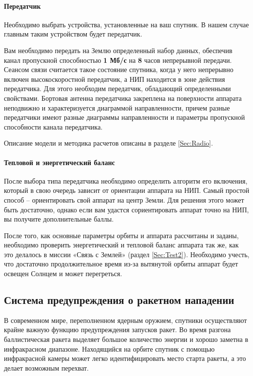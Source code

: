 \documentclass[12pt,a4paper]{article}
\begin{document}
\paragraph{Передатчик}

Необходимо выбрать устройства, установленные на ваш спутник. В нашем случае главным таким
устройством будет передатчик.

Вам необходимо передать на Землю определенный набор данных, обеспечив канал пропускной
способностью \textbf{1 Мб/с} на \textbf{8} часов непрерывной передачи. Сеансом связи
считается такое состояние спутника, когда у него непрерывно включен высокоскоростной
передатчик, а НИП находится в зоне действия передатчика. Для этого необходим передатчик,
обладающий определенными свойствами. Бортовая антенна передатчика закреплена на
поверхности аппарата неподвижно и характеризуется диаграммой направленности, причем разные
передатчики имеют разные диаграммы направленности и параметры пропускной способности
канала передатчика.

Описание модели и методика расчетов описаны в разделе \ref{Sec:Radio}.

\paragraph{Тепловой и энергетический баланс}

После выбора типа передатчика необходимо определить алгоритм его включения, который в свою
очередь зависит от ориентации аппарата на НИП. Самый простой способ – ориентировать свой
аппарат на центр Земли. Для решения этого может быть достаточно, однако если вам удастся
сориентировать аппарат точно на НИП, вы получите дополнительные баллы.

После того, как основные параметры орбиты и аппарата рассчитаны и заданы, необходимо
проверить энергетический и тепловой баланс аппарата так же, как это делалось в миссии
«Связь с Землей» (раздел \ref{Sec:Test2}). Необходимо учесть, что достаточно
  продолжительное время из-за вытянутой орбиты аппарат будет освещен Солнцем и может
  перегреться.

\clearpage
\subsection{Система предупреждения о ракетном нападении}

В современном мире, переполненном ядерным оружием, спутники осуществляют крайне важную
функцию предупреждения запусков ракет. Во время разгона баллистическая ракета выделяет
большое количество энергии и хорошо заметна в инфракрасном диапазоне. Находящийся на
орбите спутник с помощью инфракрасной камеры может легко идентифицировать место старта
ракеты, а это делает возможным перехват.
\end{document}
